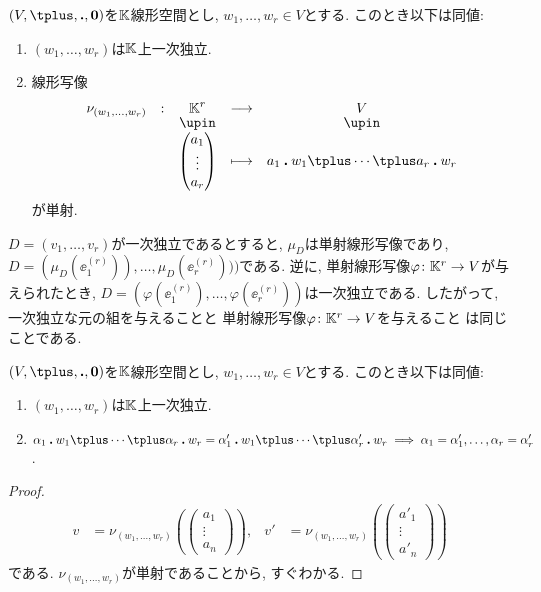 \begin{prop}
  $(V,\plus,\act,\zzero)$を$\mathbb{K}$線形空間とし,
  $w_1,\ldots,w_r\in V$とする.
  このとき以下は同値:
  \begin{enumerate}
  \item $(w_1,\ldots,w_r)$は$\mathbb{K}$上一次独立.
  \item 線形写像
    \begin{align*}
      \shazo{\nu_{(w_1,\ldots,w_r)}}{\KK^r}{V}
      {\begin{pmatrix}a_1\\\vdots\\a_r\end{pmatrix}}{a_1\act w_1\plus\cdots\plus a_r\act w_r}
    \end{align*}
    が単射.
  \end{enumerate}
\end{prop}

\begin{remark}
  $D=(v_1,\ldots,v_r)$が一次独立であるとすると,
  $\mu_D$は単射線形写像であり,
  $D=(\mu_D(\ee^{(r)}_1)),\ldots,\mu_D(\ee^{(r)}_r)))$である.
  逆に, 単射線形写像$\varphi\colon \mathbb{K}^r\to V$が与えられたとき,
  $D=(\varphi(\ee^{(r)}_1),\ldots,\varphi(\ee^{(r)}_r))$は一次独立である.
  したがって,
  一次独立な元の組を与えることと
  単射線形写像$\varphi\colon \mathbb{K}^r\to V$を与えること
  は同じことである.
\end{remark}

\begin{prop}
  $(V,\plus,\act,\zzero)$を$\mathbb{K}$線形空間とし,
  $w_1,\ldots,w_r\in V$とする.
  このとき以下は同値:
  \begin{enumerate}
  \item $(w_1,\ldots,w_r)$は$\mathbb{K}$上一次独立.
  \item $\alpha_1\act w_1\plus\cdots\plus \alpha_r\act w_r=\alpha'_1\act w_1\plus\cdots\plus \alpha'_r\act w_r \implies \alpha_1=\alpha'_1,\ldots,\alpha_r=\alpha'_r$.
  \end{enumerate}
\end{prop}
\begin{proof}
\begin{align*}
v&=\nu_{(w_1,\ldots,w_r)}(\begin{pmatrix}a_1\\\vdots\\a_n\end{pmatrix}), &
v'&=\nu_{(w_1,\ldots,w_r)}(\begin{pmatrix}a'_1\\\vdots\\a'_n\end{pmatrix}) 
\end{align*}
である. $\nu_{(w_1,\ldots,w_r)}$が単射であることから, すぐわかる.
\end{proof}

